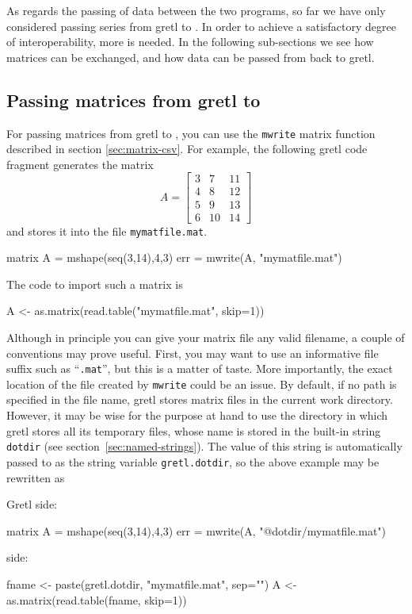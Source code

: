 As regards the passing of data between the two programs, so far we
have only considered passing series from gretl to . In
order to achieve a satisfactory degree of interoperability, more is
needed.  In the following sub-sections we see how matrices can be
exchanged, and how data can be passed from  back to
gretl.

\subsection{Passing matrices from gretl to }

For passing matrices from gretl to , you can use the
\texttt{mwrite} matrix function described in section
\ref{sec:matrix-csv}. For example, the following gretl code
fragment generates the matrix 
\[ 
A = \left[
  \begin{array}{ccc}
    3 &  7 &  11 \\ 
    4 &  8 &  12 \\ 
    5 &  9 &  13 \\ 
    6 & 10 &  14 
  \end{array}
\right]
\] 
and stores it into the file \texttt{mymatfile.mat}.
\begin{code}
  matrix A = mshape(seq(3,14),4,3)
  err = mwrite(A, "mymatfile.mat")
\end{code}
The  code to import such a matrix is
\begin{code}
  A <- as.matrix(read.table("mymatfile.mat", skip=1))
\end{code}

Although in principle you can give your matrix file any valid
filename, a couple of conventions may prove useful. First, you may
want to use an informative file suffix such as ``\texttt{.mat}'', but
this is a matter of taste. More importantly, the exact location of the
file created by \texttt{mwrite} could be an issue. By default, if no
path is specified in the file name, gretl stores matrix files in
the current work directory. However, it may be wise for the purpose at
hand to use the directory in which gretl stores all its
temporary files, whose name is stored in the built-in string
\texttt{dotdir} (see section~\ref{sec:named-strings}). The value of
this string is automatically passed to  as the string variable
\texttt{gretl.dotdir}, so the above example may be rewritten as

Gretl side:
\begin{code}
  matrix A = mshape(seq(3,14),4,3)
  err = mwrite(A, "@dotdir/mymatfile.mat")
\end{code}
 side:
\begin{code}
  fname <- paste(gretl.dotdir, "mymatfile.mat", sep="")
  A <- as.matrix(read.table(fname, skip=1))
\end{code}


